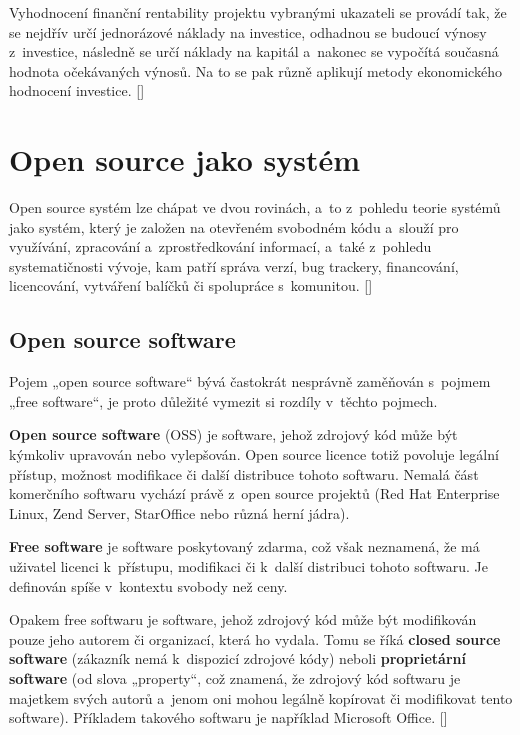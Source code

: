 \documentclass[
	11pt, oneside, printed, final, palatino, monochrome
	microtype,
	table,   %
	lof,     %
	lot     %
]{fithesis3}
\newcommand{\citepages}[2]{[\cite[#1]{#2}]}
\newcommand{\citesource}[1]{[\cite{#1}]}
\newcommand{\bold}[1]{\textbf{#1}}
\begin{document}
{Vyhodnocení finanční rentability projektu vybranými ukazateli se provádí tak, že se nejdřív určí jednorázové náklady na investice, odhadnou se budoucí výnosy z~investice, následně se určí náklady na kapitál a~nakonec se vypočítá současná hodnota očekávaných výnosů. Na to se pak různě aplikují metody ekonomického hodnocení investice. \citepages{17-18}{Podesvova2010thesis}

\section{Open source jako systém}
Open source systém lze chápat ve dvou rovinách, a~to z~pohledu teorie systémů jako systém, který je založen na otevřeném svobodném kódu a~slouží pro využívání, zpracování a~zprostředkování informací, a~také z~pohledu systematičnosti vývoje, kam patří správa verzí, bug trackery, financování, licencování, vytváření balíčků či spolupráce s~komunitou. \citepages{40}{cejpek_2005}

\subsection{Open source software}

Pojem „open source software“ bývá častokrát nesprávně zaměňován s~pojmem „free software“, je proto důležité vymezit si rozdíly v~těchto pojmech. 

\bold{Open source software} (OSS) je software, jehož zdrojový kód může být kýmkoliv upravován nebo vylepšován. Open source licence totiž povoluje legální přístup, možnost modifikace či další distribuce tohoto softwaru. Nemalá část komerčního softwaru vychází právě z~open source projektů (Red Hat Enterprise Linux, Zend Server, StarOffice nebo různá herní jádra).

\bold{Free software} je software poskytovaný zdarma, což však neznamená, že má uživatel licenci k~přístupu, modifikaci či k~další distribuci tohoto softwaru. Je definován spíše v~kontextu svobody než ceny. 

Opakem free softwaru je software, jehož zdrojový kód může být modifikován pouze jeho autorem či organizací, která ho vydala. Tomu se říká \bold{closed source software} (zákazník nemá k~dispozicí zdrojové kódy) neboli \bold{proprietární software} (od slova „property“, což znamená, že zdrojový kód softwaru je majetkem svých autorů a~jenom oni mohou legálně kopírovat či modifikovat tento software). Příkladem takového softwaru je například Microsoft Office. \citesource{mclean}

}
\end{document}
